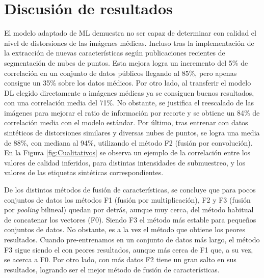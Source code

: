 \section{Discusión de resultados}
El modelo adaptado de ML demuestra no ser capaz de determinar con calidad 
el nivel de distorsiones de las imágenes médicas. Incluso tras la implementación 
de la extracción de nuevas características según publicaciones recientes 
de segmentación de nubes de puntos. Esta mejora logra un incremento del 5\% de correlación en un conjunto de datos públicos llegando al 85\%, pero apenas consigue un 35\% sobre los datos médicos. 
Por otro lado, al transferir el modelo DL elegido directamente a imágenes médicas ya se consiguen 
buenos resultados, con una correlación media del 71\%. 
No obstante, se justifica el reescalado de las imágenes para mejorar el 
ratio de información por recorte y se obtiene un 84\% de correlación media 
con el modelo estándar. Por último, tras entrenar con datos sintéticos de distorsiones similares y 
diversas nubes de puntos, se logra una media de 88\%, con mediana al 94\%, utilizando el método F2 (fusión por convolución).
En la Figura \ref{fig:Cualitativos} se observa un ejemplo de la correlación entre 
los valores de calidad inferidos, para distintas intensidades de submuestreo, 
y los valores de las etiquetas sintéticas correspondientes. 

De los distintos métodos de fusión de características, se concluye que para 
pocos conjuntos de datos los métodos F1 (fusión por multiplicación), F2 y F3 (fusión por \emph{pooling} bilineal) quedan por detrás, aunque 
muy cerca, del método habitual de concatenar los vectores (F0). 
Siendo F3 el método más estable para pequeños conjuntos de datos. 
No obstante, es a la vez el método que obtiene los peores resultados. 
Cuando pre-entrenamos en un conjunto de datos más largo, el método F3 sigue siendo 
el con peores resultados, aunque más cerca de F1 que, a su vez, se acerca a F0. 
Por otro lado, con más datos F2 tiene un gran salto en sus resultados, 
logrando ser el mejor método de fusión de características. 

